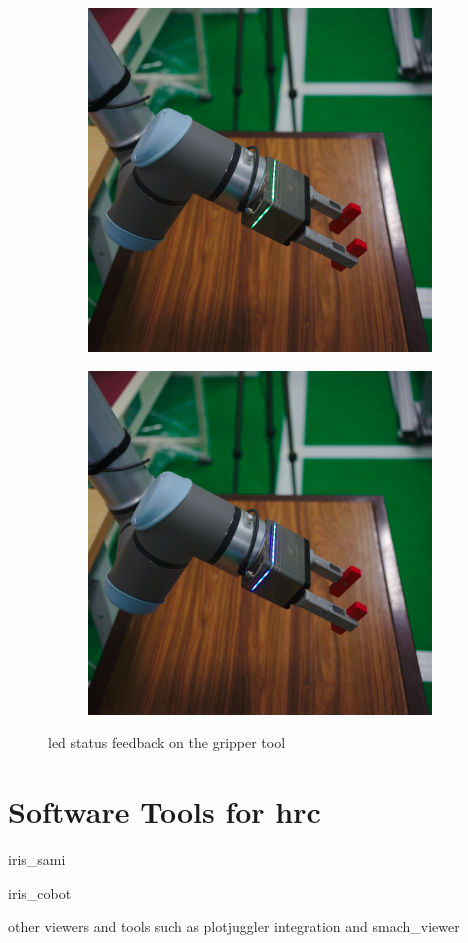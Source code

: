 \begin{figure}[h]
\begin{subfigure}{.2\linewidth}
    \end{subfigure}%
    \begin{subfigure}{.2\linewidth}
        \centering
        \includegraphics[width=.95\linewidth]{figs/chp5/grip_green.jpg}
    \end{subfigure}%
    \begin{subfigure}{.2\linewidth}
        \centering
        \includegraphics[width=.95\linewidth]{figs/chp5/grip_blue.jpg}
    \end{subfigure}
    \caption{\ac{led} status feedback on the gripper tool}
    \label{fig:gripper_leds}
\end{figure}


\section{Software Tools for \ac{hrc}}
\label{sec:tools-hrc}

\par iris\_sami
\par iris\_cobot
\par other viewers and tools such as plotjuggler integration and smach\_viewer
